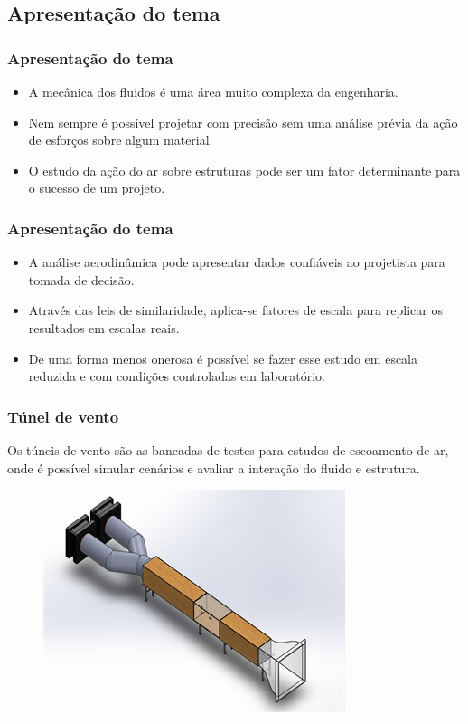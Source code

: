 \subsection{Apresentação do tema}

\begin{frame}
\frametitle{Apresentação do tema}
\begin{itemize}
    \item A mecânica dos fluidos é uma área muito complexa da engenharia.
    \item Nem sempre é possível  projetar com precisão sem uma análise prévia da ação de esforços sobre algum material. 
    \item O estudo da ação do ar sobre estruturas pode ser um fator determinante para o sucesso de um projeto. 
\end{itemize}
\end{frame}

\begin{frame}
\frametitle{Apresentação do tema}
\begin{itemize}
    \item A análise aerodinâmica pode apresentar dados confiáveis ao projetista para tomada de decisão. 
    \item Através das leis de similaridade, aplica-se fatores de escala para replicar os resultados em escalas reais. 
    \item De uma forma menos onerosa é possível se fazer esse estudo em escala reduzida e com condições controladas em laboratório.
\end{itemize}
\end{frame}

\begin{frame}
\frametitle{Túnel de vento}

Os túneis de vento são as bancadas de testes para estudos de escoamento de ar, onde é possível simular cenários e avaliar a interação do fluido e estrutura.

\begin{figure}
\centering
\includegraphics[scale = 0.4]{figuras/tuneldeventosombreado}
\end{figure}

\end{frame}
 
